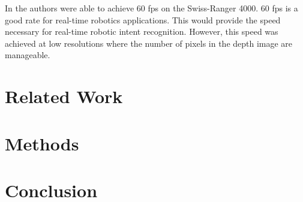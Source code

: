 \documentclass[conference]{IEEEtran}
\begin{document}
In \cite{Baak2011} the authors were able to achieve 60 fps on the Swiss-Ranger 4000. 60 fps is a good rate for real-time robotics applications. This would provide the speed necessary for real-time robotic intent recognition. However, this speed was achieved at low resolutions where the number of pixels in the depth image are manageable. 

\section{Related Work}
\label{sec:relatedwork}

\section{Methods}
\label{sec:method}

\section{Conclusion}
\label{sec:clonclusion}




\end{document}
